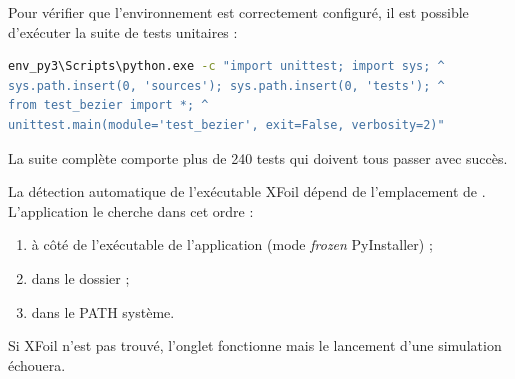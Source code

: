 Pour vérifier que l'environnement est correctement configuré, il
est possible d'exécuter la suite de tests unitaires :

\begin{lstlisting}[language=bash,caption={Exécution des tests}]
env_py3\Scripts\python.exe -c "import unittest; import sys; ^
sys.path.insert(0, 'sources'); sys.path.insert(0, 'tests'); ^
from test_bezier import *; ^
unittest.main(module='test_bezier', exit=False, verbosity=2)"
\end{lstlisting}

La suite complète comporte plus de 240 tests qui doivent tous
passer avec succès.

\begin{attention}
La détection automatique de l'exécutable XFoil dépend de
l'emplacement de . L'application le cherche
dans cet ordre :
\begin{enumerate}
    \item à côté de l'exécutable de l'application (mode
        \emph{frozen} PyInstaller) ;
    \item dans le dossier  ;
    \item dans le PATH système.
\end{enumerate}
Si XFoil n'est pas trouvé, l'onglet 
fonctionne mais le lancement d'une simulation échouera.
\end{attention}

